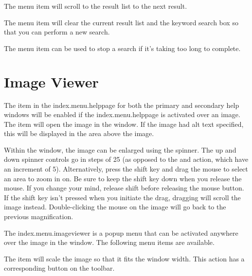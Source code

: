 The  menu item will 
scroll to the result list to the next result.

The  menu item will
clear the current result list and the keyword search box so that you
can perform a new search.

The  menu item can be
used to stop a search if it's taking too long to complete.

\section{Image Viewer}
\label{sec:helpimageviewer}

The  item in the \gls{index.menu.helppage}
for both the primary and secondary help windows will be enabled if
the \gls{index.menu.helppage} is activated over an image. The
 item will open the image in the
 window.  If the image had alt text
specified, this will be displayed in the area above the image.

Within the  window, the image can be enlarged
using the  spinner. The up and down
spinner controls go in steps of 25 (as opposed to the
 and 
action, which have an increment of 5). Alternatively, press the
shift key  and drag the mouse to select an area to
zoom in on. Be sure to keep the shift key down when you release the
mouse. If you change your mind, release shift before releasing the
mouse button. If the shift key isn't pressed when you initiate the
drag, dragging will scroll the image instead. Double-clicking the
mouse on the image will go back to the previous magnification.


The \gls{index.menu.imageviewer} is a popup menu that can
be activated anywhere over the image in the 
window. The following menu items are available.


The  item will scale the image so
that it fits the window width. This action has a corresponding
button on the toolbar.

